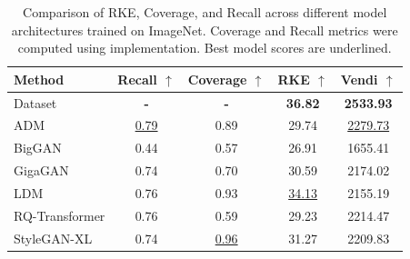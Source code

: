 \documentclass{article}
\theoremstyle{plain}
\theoremstyle{definition}
\renewcommand{\cite}{\citep}
\begin{document}
\begin{appendices}
\begin{table}[ht]
\centering
\caption{Comparison of RKE, Coverage, and Recall across different model architectures trained on ImageNet. Coverage and Recall metrics were computed using \citet{stein_exposing_2023} implementation. Best model scores are underlined.}
\label{tab:imagenet_rke_vs_recall_coverage}
\begin{tabular}{lcccc}
\toprule
Method & Recall $\uparrow$ & Coverage $\uparrow$ & RKE $\uparrow$ & Vendi $\uparrow$\\
\midrule
Dataset & \textbf{-} & \textbf{-} & \textbf{36.82} & \textbf{2533.93}\\
\midrule
ADM \cite{dhariwal2021adm}  & \underline{0.79} & 0.89 & 29.74 & \underline{2279.73}\\
BigGAN \cite{brock_large_2018} & 0.44 & 0.57 & 26.91 & 1655.41\\
GigaGAN \cite{kang2023gigagan} & 0.74 & 0.70 & 30.59 & 2174.02\\
LDM \cite{rombach2022ldm} & 0.76 & 0.93 & \underline{34.13} & 2155.19\\
RQ-Transformer \cite{lee2022autoregressive} & 0.76 & 0.59 & 29.23 & 2214.47\\
StyleGAN-XL \cite{sauer2022styleganxl} & 0.74 & \underline{0.96} & 31.27 & 2209.83\\
\bottomrule
\end{tabular}
\end{table}



\end{appendices}
\end{document}
